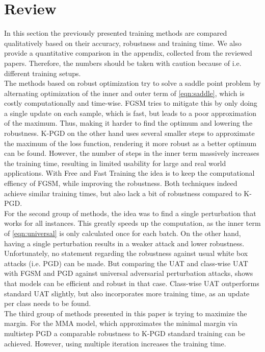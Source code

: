 \documentclass{article}
\begin{document}
\section{Review} \label{rev}
In this section the previously presented training methods are compared qualitatively based on their accuracy, robustness and training time. We also provide a quantitative comparison in the appendix, collected from the reviewed papers. Therefore, the numbers should be taken with caution because of i.e. different training setups. \\
The methods based on robust optimization try to solve a saddle point problem by alternating optimization of the inner and outer term of \ref{eqn:saddle}, which is costly computationally and time-wise. FGSM tries to mitigate this by only doing a single update on each sample, which is fast, but leads to a poor approximation of the maximum. Thus, making it harder to find the optimum and lowering the robustness. K-PGD on the other hand uses several smaller steps to approximate the maximum of the loss function, rendering it more robust as a better optimum can be found. However, the number of steps in the inner term massively increases the training time, resulting in limited usability for large and real world applications. With Free and Fast Training the idea is to keep the computational effiency of FGSM, while improving the robustness. Both techniques indeed achieve similar training times, but also lack a bit of robustness compared to K-PGD. \\
For the second group of methods, the idea was to find a single perturbation that works for all instances. This greatly speeds up the computation, as the inner term of \ref{eqn:universal} is only calculated once for each batch. On the other hand, having a single perturbation results in a weaker attack and lower robustness. Unfortunately, no statement regarding the robustness against usual white box attacks (i.e. PGD) can be made. But comparing the UAT and class-wise UAT with FGSM and PGD against universal adversarial perturbation attacks, shows that models can be efficient and robust in that case. Class-wise UAT outperforms standard UAT slightly, but also incorporates more training time, as an update per class needs to be found. \\
The third group of methods presented in this paper is trying to maximize the margin. For the MMA model, which approximates the minimal margin via multistep PGD a comparable robustness to K-PGD standard training can be achieved. However, using multiple iteration increases the training time.
  
\end{document}
